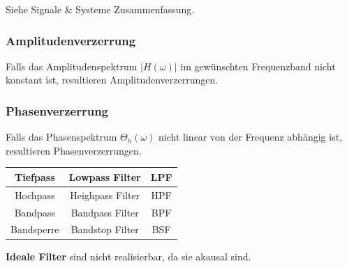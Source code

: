 Siehe Signale \& Systeme Zusammenfassung.\\


\subsubsection{Amplitudenverzerrung}
Falls das Amplitudenspektrum $|H(\omega)|$ im gewünschten Frequenzband nicht konstant ist,
resultieren Amplitudenverzerrungen.

\subsubsection{Phasenverzerrung}
Falls das Phasenspektrum $\Theta_h (\omega)$ nicht linear von der Frequenz abhängig ist, resultieren
Phasenverzerrungen.\\



\begin{multicols}{2}
\begin{center}
\begin{tabular}{|c|c|c|}
\hline
Tiefpass & Lowpass Filter & LPF \\
\hline
Hochpass & Heighpass Filter & HPF \\
\hline
Bandpass & Bandpass Filter & BPF \\
\hline
Bandsperre & Bandstop Filter & BSF \\
\hline
\end{tabular}
\end{center}
\columnbreak

\textbf{Ideale Filter} sind nicht realisierbar, da sie akausal sind.
\end{multicols}

